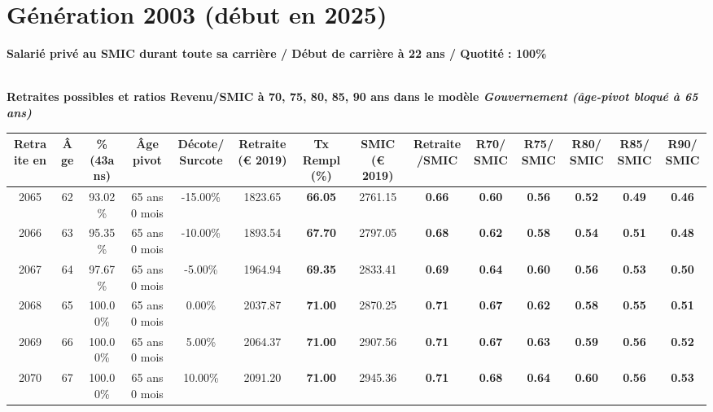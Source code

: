 \newpage 
 
\section{Génération 2003 (début en 2025)\label{SMIC_100_2003_22_0}} 
 
{\bf \noindent Salarié privé au SMIC durant toute sa carrière / Début de carrière à 22 ans / Quotité : 100\%}  ~ 

 ~\\{\bf \noindent Retraites possibles et ratios Revenu/SMIC à 70, 75, 80, 85, 90 ans dans le modèle \emph{Gouvernement (âge-pivot bloqué à 65 ans)}}  
 
\begin{adjustbox}{max width=\textwidth} 
\begin{tabular}[htb]{|c|c||c|c|c||c|c||c|c||c|c|c|c|c|} 
\hline 
 Retraite en &  Âge &  \%(43ans) &  Âge pivot &  Décote/Surcote &  Retraite (\euro{} 2019) &  Tx Rempl(\%) &  SMIC (\euro{} 2019) &  Retraite/SMIC &  R70/SMIC &  R75/SMIC &  R80/SMIC &  R85/SMIC &  R90/SMIC \\ 
\hline \hline 
 2065 &  62 &  93.02\% &  65 ans 0 mois &  -15.00\% &  1823.65 &  {\bf 66.05} &  2761.15 &  {\bf {\color{red} 0.66}} &  {\bf {\color{red} 0.60}} &  {\bf {\color{red} 0.56}} &  {\bf {\color{red} 0.52}} &  {\bf {\color{red} 0.49}} &  {\bf {\color{red} 0.46}} \\ 
\hline 
 2066 &  63 &  95.35\% &  65 ans 0 mois &  -10.00\% &  1893.54 &  {\bf 67.70} &  2797.05 &  {\bf {\color{red} 0.68}} &  {\bf {\color{red} 0.62}} &  {\bf {\color{red} 0.58}} &  {\bf {\color{red} 0.54}} &  {\bf {\color{red} 0.51}} &  {\bf {\color{red} 0.48}} \\ 
\hline 
 2067 &  64 &  97.67\% &  65 ans 0 mois &  -5.00\% &  1964.94 &  {\bf 69.35} &  2833.41 &  {\bf {\color{red} 0.69}} &  {\bf {\color{red} 0.64}} &  {\bf {\color{red} 0.60}} &  {\bf {\color{red} 0.56}} &  {\bf {\color{red} 0.53}} &  {\bf {\color{red} 0.50}} \\ 
\hline 
 2068 &  65 &  100.00\% &  65 ans 0 mois &  0.00\% &  2037.87 &  {\bf 71.00} &  2870.25 &  {\bf {\color{red} 0.71}} &  {\bf {\color{red} 0.67}} &  {\bf {\color{red} 0.62}} &  {\bf {\color{red} 0.58}} &  {\bf {\color{red} 0.55}} &  {\bf {\color{red} 0.51}} \\ 
\hline 
 2069 &  66 &  100.00\% &  65 ans 0 mois &  5.00\% &  2064.37 &  {\bf 71.00} &  2907.56 &  {\bf {\color{red} 0.71}} &  {\bf {\color{red} 0.67}} &  {\bf {\color{red} 0.63}} &  {\bf {\color{red} 0.59}} &  {\bf {\color{red} 0.56}} &  {\bf {\color{red} 0.52}} \\ 
\hline 
 2070 &  67 &  100.00\% &  65 ans 0 mois &  10.00\% &  2091.20 &  {\bf 71.00} &  2945.36 &  {\bf {\color{red} 0.71}} &  {\bf {\color{red} 0.68}} &  {\bf {\color{red} 0.64}} &  {\bf {\color{red} 0.60}} &  {\bf {\color{red} 0.56}} &  {\bf {\color{red} 0.53}} \\ 
\hline 
\hline 
\end{tabular} 
\end{adjustbox} 
 
